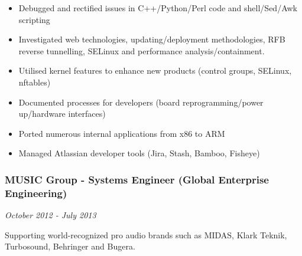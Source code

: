 \begin{itemize}
\item
  Debugged and rectified issues in C++/Python/Perl code and
  shell/Sed/Awk scripting
\item
  Investigated web technologies, updating/deployment methodologies, RFB
  reverse tunnelling, SELinux and performance analysis/containment.
\item
  Utilised kernel features to enhance new products (control groups,
  SELinux, nftables)
\item
  Documented processes for developers (board reprogramming/power
  up/hardware interfaces)
\item
  Ported numerous internal applications from x86 to ARM
\item
  Managed Atlassian developer tools (Jira, Stash, Bamboo, Fisheye)
\end{itemize}

\subsubsection{MUSIC Group - Systems Engineer (Global Enterprise
Engineering)}\label{music-group---systems-engineer-global-enterprise-engineering}

\emph{October 2012 - July 2013}

Supporting world-recognized pro audio brands such as MIDAS, Klark
Teknik, Turbosound, Behringer and Bugera.

